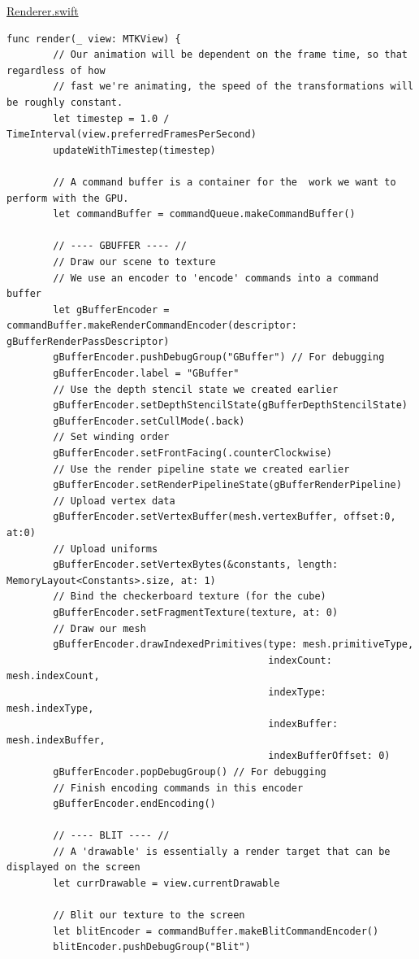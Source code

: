 \documentclass[11pt]{article}
\begin{document}
\uline{Renderer.swift}
\begin{verbatim}
func render(_ view: MTKView) {
        // Our animation will be dependent on the frame time, so that regardless of how
        // fast we're animating, the speed of the transformations will be roughly constant.
        let timestep = 1.0 / TimeInterval(view.preferredFramesPerSecond)
        updateWithTimestep(timestep)

        // A command buffer is a container for the  work we want to perform with the GPU.
        let commandBuffer = commandQueue.makeCommandBuffer()

        // ---- GBUFFER ---- //
        // Draw our scene to texture
        // We use an encoder to 'encode' commands into a command buffer
        let gBufferEncoder = commandBuffer.makeRenderCommandEncoder(descriptor: gBufferRenderPassDescriptor)
        gBufferEncoder.pushDebugGroup("GBuffer") // For debugging
        gBufferEncoder.label = "GBuffer"
        // Use the depth stencil state we created earlier
        gBufferEncoder.setDepthStencilState(gBufferDepthStencilState)
        gBufferEncoder.setCullMode(.back)
        // Set winding order
        gBufferEncoder.setFrontFacing(.counterClockwise)
        // Use the render pipeline state we created earlier
        gBufferEncoder.setRenderPipelineState(gBufferRenderPipeline)
        // Upload vertex data
        gBufferEncoder.setVertexBuffer(mesh.vertexBuffer, offset:0, at:0)
        // Upload uniforms
        gBufferEncoder.setVertexBytes(&constants, length: MemoryLayout<Constants>.size, at: 1)
        // Bind the checkerboard texture (for the cube)
        gBufferEncoder.setFragmentTexture(texture, at: 0)
        // Draw our mesh
        gBufferEncoder.drawIndexedPrimitives(type: mesh.primitiveType,
                                             indexCount: mesh.indexCount,
                                             indexType: mesh.indexType,
                                             indexBuffer: mesh.indexBuffer,
                                             indexBufferOffset: 0)
        gBufferEncoder.popDebugGroup() // For debugging
        // Finish encoding commands in this encoder
        gBufferEncoder.endEncoding()

        // ---- BLIT ---- //
        // A 'drawable' is essentially a render target that can be displayed on the screen
        let currDrawable = view.currentDrawable

        // Blit our texture to the screen
        let blitEncoder = commandBuffer.makeBlitCommandEncoder()
        blitEncoder.pushDebugGroup("Blit")


\end{verbatim}
\end{document}
